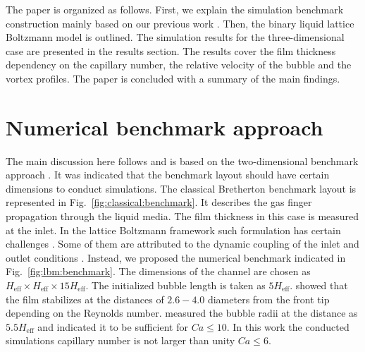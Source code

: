 \documentclass{article}
\begin{document}
The paper is organized as follows.  First, we explain the simulation benchmark construction
mainly based on our previous work \cite{kuzmin-binary2d}. Then, the binary liquid lattice
Boltzmann model is outlined. The simulation results for the three-dimensional case are presented in
the results section. The results cover the film thickness dependency on the capillary number, the
relative velocity of the bubble and the vortex profiles. The paper
is concluded with a summary of the main findings.

\section{Numerical benchmark approach}
\label{sec:numerical:benchmark}
The main discussion here follows and is based on the two-dimensional benchmark approach
\cite{kuzmin-binary2d}. It was indicated that the benchmark layout should have certain
dimensions to conduct simulations. The classical Bretherton benchmark layout is represented in
Fig.~\ref{fig:classical:benchmark}. It describes the gas finger propagation through the liquid media.
The film thickness in this case is measured at the inlet. In the lattice Boltzmann framework such
formulation has certain challenges \cite{kuzmin-binary2d}. Some of them are attributed to the
dynamic coupling of the inlet and outlet conditions \cite{giavedoni-numerical}. Instead, we
proposed the numerical benchmark indicated in Fig.~\ref{fig:lbm:benchmark}. The dimensions of the
channel are chosen as $H_{\mathrm{eff}}\times H_{\mathrm{eff}} \times 15 H_{\mathrm{eff}}$. The
initialized bubble length is taken as $5 H_{\mathrm{eff}}$. \citet{giavedoni-numerical} showed that
the film stabilizes at the distances of $2.6-4.0$ diameters
from the front tip depending on the Reynolds number. \citet{heil-threedim} measured the bubble radii
at the distance as $5.5 H_{\mathrm{eff}}$ and indicated it to be sufficient for $Ca\leq 10$. In
this work the conducted simulations capillary number is not larger than unity $Ca\leq 6$.
\end{document}
